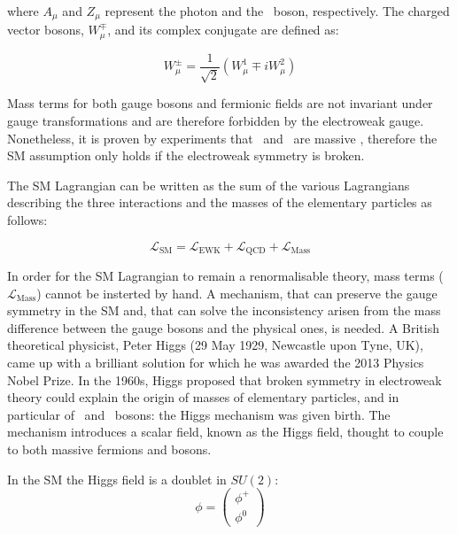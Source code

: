 			\noindent where $A_\mu$ and $Z_\mu$ represent the photon and the \Zboson\ boson, respectively. The charged vector bosons, $W_\mu^\mp$, and its complex conjugate are defined as:

			\begin{equation}
			\label{eq:Wboson}
				W_{\mu}^\pm = \frac{1}{\sqrt{2}} \displaystyle \left ( W_{\mu}^1 \mp i W_{\mu}^2 \right )
			\end{equation}

			Mass terms for both gauge bosons and fermionic fields are not invariant under gauge transformations and are therefore forbidden by the electroweak gauge. Nonetheless, it is proven by experiments that \Wboson\ and \Zboson\ are massive \cite{Pich2012}, therefore the SM assumption only holds if the electroweak symmetry is broken. 

			The SM Lagrangian can be written as the sum of the various Lagrangians describing the three interactions and the masses of the elementary particles as follows:

			\begin{equation}
			\label{eq:SM_Lagrangian}
				\mathcal{L_{\mathrm{SM}}} = \mathcal{L_{\mathrm{EWK}}} + \mathcal{L_{\mathrm{QCD}}} + \mathcal{L_{\mathrm{Mass}}}
			\end{equation}

			\noindent In order for the SM Lagrangian to remain a renormalisable theory, mass terms ($\mathcal{L_{\mathrm{Mass}}}$) cannot be insterted by hand. A mechanism, that can preserve the gauge symmetry in the SM and, that can solve the inconsistency arisen from the mass difference between the gauge bosons and the physical ones, is needed. A British theoretical physicist, Peter Higgs (29 May 1929, Newcastle upon Tyne, UK), came up with a brilliant solution for which he was awarded the 2013 Physics Nobel Prize. In the 1960s, Higgs proposed that broken symmetry in electroweak theory could explain the origin of masses of elementary particles, and in particular of \Wboson\ and \Zboson\ bosons: the Higgs mechanism was given birth. %
			The mechanism introduces a scalar field, known as the Higgs field, thought to couple to both massive fermions and bosons. 

			In the SM the Higgs field is a doublet in $SU(2)$:
			\begin{equation}
				\phi = 
				\begin{pmatrix}
					\phi^+ \\ \phi^0
				\end{pmatrix} 
			\end{equation}

